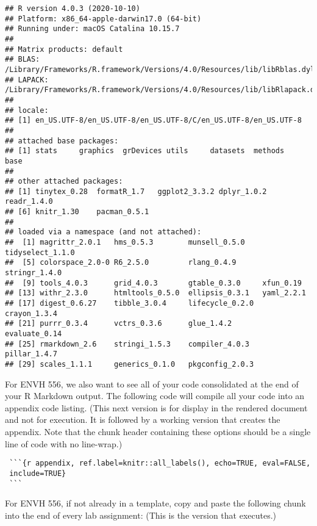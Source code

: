 \documentclass[
]{article}
\begin{document}
\begin{verbatim}
## R version 4.0.3 (2020-10-10)
## Platform: x86_64-apple-darwin17.0 (64-bit)
## Running under: macOS Catalina 10.15.7
## 
## Matrix products: default
## BLAS:   /Library/Frameworks/R.framework/Versions/4.0/Resources/lib/libRblas.dylib
## LAPACK: /Library/Frameworks/R.framework/Versions/4.0/Resources/lib/libRlapack.dylib
## 
## locale:
## [1] en_US.UTF-8/en_US.UTF-8/en_US.UTF-8/C/en_US.UTF-8/en_US.UTF-8
## 
## attached base packages:
## [1] stats     graphics  grDevices utils     datasets  methods   base     
## 
## other attached packages:
## [1] tinytex_0.28  formatR_1.7   ggplot2_3.3.2 dplyr_1.0.2   readr_1.4.0  
## [6] knitr_1.30    pacman_0.5.1 
## 
## loaded via a namespace (and not attached):
##  [1] magrittr_2.0.1   hms_0.5.3        munsell_0.5.0    tidyselect_1.1.0
##  [5] colorspace_2.0-0 R6_2.5.0         rlang_0.4.9      stringr_1.4.0   
##  [9] tools_4.0.3      grid_4.0.3       gtable_0.3.0     xfun_0.19       
## [13] withr_2.3.0      htmltools_0.5.0  ellipsis_0.3.1   yaml_2.2.1      
## [17] digest_0.6.27    tibble_3.0.4     lifecycle_0.2.0  crayon_1.3.4    
## [21] purrr_0.3.4      vctrs_0.3.6      glue_1.4.2       evaluate_0.14   
## [25] rmarkdown_2.6    stringi_1.5.3    compiler_4.0.3   pillar_1.4.7    
## [29] scales_1.1.1     generics_0.1.0   pkgconfig_2.0.3
\end{verbatim}

For ENVH 556, we also want to see all of your code consolidated at the
end of your R Markdown output. The following code will compile all your
code into an appendix code listing. (This next version is for display in
the rendered document and not for execution. It is followed by a working
version that creates the appendix. Note that the chunk header containing
these options should be a single line of code with no line-wrap.)

\begin{verbatim}
 ```{r appendix, ref.label=knitr::all_labels(), echo=TRUE, eval=FALSE, 
 include=TRUE}
 ```
\end{verbatim}

For ENVH 556, if not already in a template, copy and paste the following
chunk into the end of every lab assignment: (This is the version that
executes.)
\end{document}
